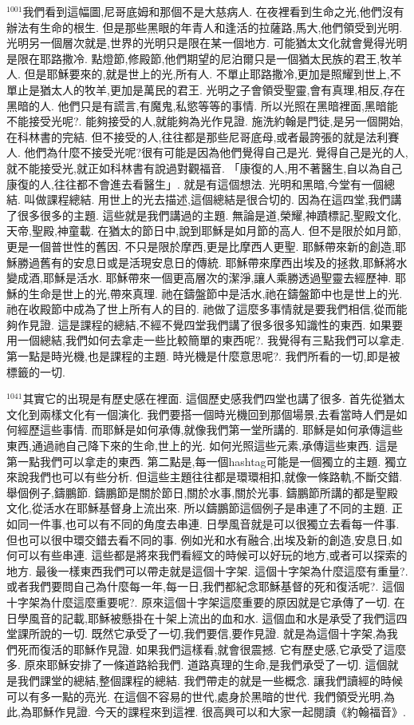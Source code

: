 \documentclass{book}
\begin{document}
$^{1001}$我們看到這幅圖,尼哥底姆和那個不是大慈病人.
在夜裡看到生命之光,他們沒有辦法有生命的根生.
但是那些黑眼的年青人和逢活的拉薩路,馬大,他們領受到光明.
光明另一個層次就是,世界的光明只是限在某一個地方.
可能猶太文化就會覺得光明是限在耶路撒冷.
點燈節,修殿節,他們期望的尼泊爾只是一個猶太民族的君王,牧羊人.
但是耶穌要來的,就是世上的光,所有人.
不單止耶路撒冷,更加是照耀到世上,不單止是猶太人的牧羊,更加是萬民的君王.
光明之子會領受聖靈,會有真理,相反,存在黑暗的人.
他們只是有謊言,有魔鬼,私慾等等的事情.
所以光照在黑暗裡面,黑暗能不能接受光呢?.
能夠接受的人,就能夠為光作見證.
施洗約翰是門徒,是另一個開始,在科林書的完結.
但不接受的人,往往都是那些尼哥底母,或者最誇張的就是法利賽人.
他們為什麼不接受光呢?很有可能是因為他們覺得自己是光.
覺得自己是光的人,就不能接受光,就正如科林書有說過對觀福音.
「康復的人,用不著醫生,自以為自己康復的人,往往都不會進去看醫生」.
就是有這個想法.
光明和黑暗,今堂有一個總結.
叫做課程總結.
用世上的光去描述,這個總結是很合切的.
因為在這四堂,我們講了很多很多的主題.
這些就是我們講過的主題.
無論是道,榮耀,神蹟標記,聖殿文化,天帝,聖殿,神童載.
在猶太的節日中,說到耶穌是如月節的高人.
但不是限於如月節,更是一個普世性的舊因.
不只是限於摩西,更是比摩西人更聖.
耶穌帶來新的創造,耶穌勝過舊有的安息日或是活現安息日的傳統.
耶穌帶來摩西出埃及的拯救,耶穌將水變成酒,耶穌是活水.
耶穌帶來一個更高層次的潔淨,讓人乘勝透過聖靈去經歷神.
耶穌的生命是世上的光,帶來真理.
祂在鑄盤節中是活水,祂在鑄盤節中也是世上的光.
祂在收殿節中成為了世上所有人的目的.
祂做了這麼多事情就是要我們相信,從而能夠作見證.
這是課程的總結,不經不覺四堂我們講了很多很多知識性的東西.
如果要用一個總結,我們如何去拿走一些比較簡單的東西呢?.
我覺得有三點我們可以拿走.
第一點是時光機,也是課程的主題.
時光機是什麼意思呢?.
我們所看的一切,即是被標籤的一切.

$^{1041}$其實它的出現是有歷史感在裡面.
這個歷史感我們四堂也講了很多.
首先從猶太文化到兩樣文化有一個演化.
我們要搭一個時光機回到那個場景,去看當時人們是如何經歷這些事情.
而耶穌是如何承傳,就像我們第一堂所講的.
耶穌是如何承傳這些東西,通過祂自己降下來的生命,世上的光.
如何光照這些元素,承傳這些東西.
這是第一點我們可以拿走的東西.
第二點是,每一個hashtag可能是一個獨立的主題.
獨立來說我們也可以有些分析.
但這些主題往往都是環環相扣,就像一條路軌,不斷交錯.
舉個例子,鑄鵬節.
鑄鵬節是關於節日,關於水事,關於光事.
鑄鵬節所講的都是聖殿文化,從活水在耶穌基督身上流出來.
所以鑄鵬節這個例子是串連了不同的主題.
正如同一件事,也可以有不同的角度去串連.
日學風音就是可以很獨立去看每一件事.
但也可以很中環交錯去看不同的事.
例如光和水有融合,出埃及新的創造,安息日,如何可以有些串連.
這些都是將來我們看經文的時候可以好玩的地方,或者可以探索的地方.
最後一樣東西我們可以帶走就是這個十字架.
這個十字架為什麼這麼有重量?.
或者我們要問自己為什麼每一年,每一日,我們都紀念耶穌基督的死和復活呢?.
這個十字架為什麼這麼重要呢?.
原來這個十字架這麼重要的原因就是它承傳了一切.
在日學風音的記載,耶穌被懸掛在十架上流出的血和水.
這個血和水是承受了我們這四堂課所說的一切.
既然它承受了一切,我們要信,要作見證.
就是為這個十字架,為我們死而復活的耶穌作見證.
如果我們這樣看,就會很震撼.
它有歷史感,它承受了這麼多.
原來耶穌安排了一條道路給我們.
道路真理的生命,是我們承受了一切.
這個就是我們課堂的總結,整個課程的總結.
我們帶走的就是一些概念.
讓我們讀經的時候可以有多一點的亮光.
在這個不容易的世代,處身於黑暗的世代.
我們領受光明,為此,為耶穌作見證.
今天的課程來到這裡.
很高興可以和大家一起閱讀《約翰福音》.
\end{document}
